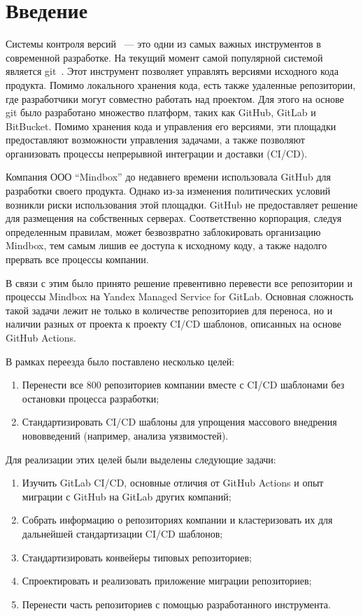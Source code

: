 \chapter*{Введение}

Системы контроля версий~\cite{vcs} — это одни из самых важных инструментов в современной разработке.
На текущий момент самой популярной системой является git~\cite{git}.
Этот инструмент позволяет управлять версиями исходного кода продукта.
Помимо локального хранения кода, есть также удаленные репозитории, где разработчики могут совместно работать над проектом.
Для этого на основе git было разработано множество платформ, таких как GitHub\cite{github}, GitLab\cite{gitlab} и BitBucket\cite{bitbucket}.
Помимо хранения кода и управления его версиями, эти площадки предоставляют возможности управления задачами,
а также позволяют организовать процессы непрерывной интеграции и доставки (CI/CD)\cite{ci-cd}.

Компания ООО \enquote{Mindbox}\cite{mindbox} до недавнего времени использовала GitHub для разработки своего продукта.
Однако из-за изменения политических условий возникли риски использования этой площадки.
GitHub не предоставляет решение для размещения на собственных серверах.
Соответственно корпорация, следуя определенным правилам, может безвозвратно заблокировать организацию Mindbox,
тем самым лишив ее доступа к исходному коду, а также надолго прервать все процессы компании.

В связи с этим было принято решение превентивно перевести все репозитории и процессы Mindbox на Yandex Managed Service for GitLab.
Основная сложность такой задачи лежит не только в количестве репозиториев для переноса,
но и наличии разных от проекта к проекту CI/CD шаблонов, описанных на основе GitHub Actions.

В рамках переезда было поставлено несколько целей:
\begin{enumerate}
  \item Перенести все 800 репозиториев компании вместе с CI/CD шаблонами без остановки процесса разработки;
  \item Стандартизировать CI/CD шаблоны для упрощения массового внедрения нововведений (например, анализа уязвимостей).
\end{enumerate}

Для реализации этих целей были выделены следующие задачи:
\begin{enumerate}
  \item Изучить GitLab CI/CD, основные отличия от GitHub Actions и опыт миграции с GitHub на GitLab других компаний;
  \item Собрать информацию о репозиториях компании и кластеризовать их для дальнейшей стандартизации CI/CD шаблонов;
  \item Стандартизировать конвейеры типовых репозиториев;
  \item Спроектировать и реализовать приложение миграции репозиториев;
  \item Перенести часть репозиториев с помощью разработанного инструмента.
\end{enumerate}
